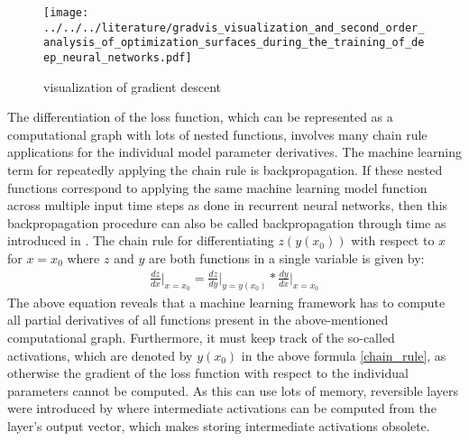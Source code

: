 \documentclass[draft,final]{vutinfth} %
\begin{document}
    \begin{figure}[H]
        \centering{}
        \texttt{[image: ../../../literature/gradvis\_visualization\_and\_second\_order\_analysis\_of\_optimization\_surfaces\_during\_the\_training\_of\_deep\_neural\_networks.pdf]}
        \caption{visualization of gradient descent}
        \label{fig:gradient_descent_vis}
    \end{figure}
    The differentiation of the loss function, which can be represented as a computational graph with lots of nested functions, involves many chain rule applications for the individual model parameter derivatives. The machine learning term for repeatedly applying the chain rule is backpropagation.
    If these nested functions correspond to applying the same machine learning model function across multiple input time steps as done in recurrent neural networks, then this backpropagation procedure can also be called backpropagation through time as introduced in \cite{GradientDescent}.
    The chain rule for differentiating $z(y(x_0))$ with respect to $x$ for $x=x_0$ where $z$ and $y$ are both functions in a single variable is given by:
    \begin{align}
        \label{chain_rule}
        \frac{dz}{dx} \Bigr\rvert_{x=x_0} = \frac{dz}{dy} \Bigr\rvert_{y=y(x_0)} * \frac{dy}{dx} \Bigr\rvert_{x=x_0}
    \end{align}
    The above equation reveals that a machine learning framework has to compute all partial derivatives of all functions present in the above-mentioned computational graph.
    Furthermore, it must keep track of the so-called activations, which are denoted by $y(x_0)$ in the above formula \ref{chain_rule}, as otherwise the gradient of the loss function with respect to the individual parameters cannot be computed.
    As this can use lots of memory, reversible layers were introduced by \cite{ReversibleLayer} where intermediate activations can be computed from the layer's output vector, which makes storing intermediate activations obsolete.
\end{document}
